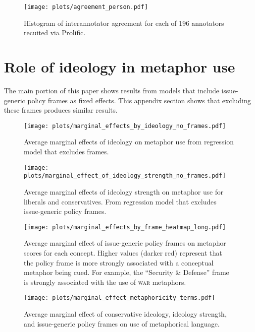 \begin{figure}[htbp!]
    \centering
    \texttt{[image: plots/agreement\_person.pdf]}
    \caption{Histogram of interannotator agreement for each of 196 annotators recuited via Prolific.}
    \label{fig:agreement-person}
\end{figure}


\section{Role of ideology in metaphor use}
The main portion of this paper shows results from models that include issue-generic policy frames \citep{boydstun2013identifying} as fixed effects. This appendix section shows that excluding these frames produces similar results.

\begin{figure}[htbp!]
    \centering
    \texttt{[image: plots/marginal\_effects\_by\_ideology\_no\_frames.pdf]}
    \caption{Average marginal effects of ideology on metaphor use from regression model that excludes frames.}
    \label{fig:ideology-effect-no-frame}
\end{figure}

\begin{figure}[htbp!]
    \centering
    \texttt{[image: plots/marginal\_effect\_of\_ideology\_strength\_no\_frames.pdf]}
    \caption{Average marginal effects of ideology strength on metaphor use for liberals and conservatives. From regression model that excludes issue-generic policy frames.}
    \label{fig:magnitude-effect-no-frame}
\end{figure}


\begin{figure}[htbp!]
    \centering
    \texttt{[image: plots/marginal\_effects\_by\_frame\_heatmap\_long.pdf]}
    \caption{Average marginal effect of issue-generic policy frames on metaphor scores for each concept. Higher values (darker red) represent that the policy frame is more strongly associated with a conceptual metaphor being cued. For example, the ``Security \& Defense'' frame is strongly associated with the use of \textsc{war} metaphors.}
    \label{fig:frame-effect}
\end{figure}

\begin{figure}
    \centering
\texttt{[image: plots/marginal\_effect\_metaphoricity\_terms.pdf]}
    \caption{Average marginal effect of conservative ideology, ideology strength, and issue-generic policy frames on use of metaphorical language.}
    \label{fig:overall-metaphoricity-all-vars}
\end{figure}

